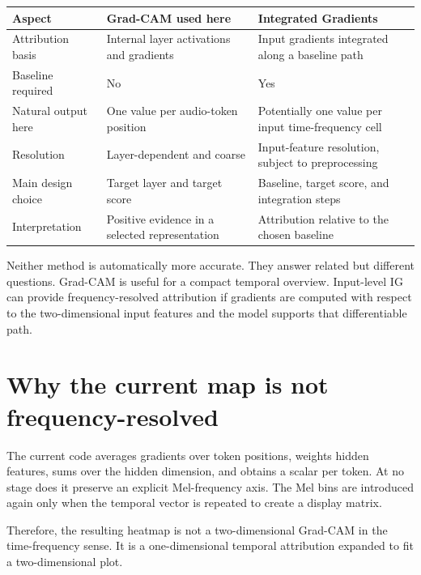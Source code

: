 \documentclass[11pt,a4paper]{article}
\begin{document}
\begin{center}
\begin{tabularx}{\linewidth}{lXX}
\toprule
\textbf{Aspect} & \textbf{Grad-CAM used here} & \textbf{Integrated Gradients}\\
\midrule
Attribution basis & Internal layer activations and gradients & Input gradients integrated along a baseline path\\
Baseline required & No & Yes\\
Natural output here & One value per audio-token position & Potentially one value per input time-frequency cell\\
Resolution & Layer-dependent and coarse & Input-feature resolution, subject to preprocessing\\
Main design choice & Target layer and target score & Baseline, target score, and integration steps\\
Interpretation & Positive evidence in a selected representation & Attribution relative to the chosen baseline\\
\bottomrule
\end{tabularx}
\end{center}

Neither method is automatically more accurate. They answer related but different questions. Grad-CAM is useful for a compact temporal overview. Input-level IG can provide frequency-resolved attribution if gradients are computed with respect to the two-dimensional input features and the model supports that differentiable path.

\section{Why the current map is not frequency-resolved}
The current code averages gradients over token positions, weights hidden features, sums over the hidden dimension, and obtains a scalar per token. At no stage does it preserve an explicit Mel-frequency axis. The Mel bins are introduced again only when the temporal vector is repeated to create a display matrix.

Therefore, the resulting heatmap is not a two-dimensional Grad-CAM in the time-frequency sense. It is a one-dimensional temporal attribution expanded to fit a two-dimensional plot.
\end{document}
